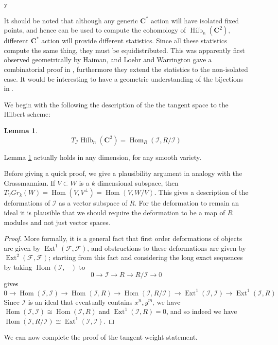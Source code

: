 y\documentclass{amsart}[12pt]
\theoremstyle{definition}
\newtheorem{lemma}[dummy]{Lemma}
\newcommand{\C}{\mathbf{C}}
\DeclareMathOperator{\Hilb}{Hilb}
\DeclareMathOperator{\Ext}{Ext}
\DeclareMathOperator{\Hom}{Hom}
\begin{document}
It should be noted that although any generic $\C^*$ action will have isolated fixed points, and hence can be used to compute the cohomology of $\Hilb_n(\C^2)$, different $\C^*$ action will provide different statistics.  Since all these statistics compute the same thing, they must be equidistributed.  This was apparently first observed geometrically by Haiman, and Loehr and Warrington gave a combinatorial proof in \cite{LW}, furthermore they extend the statistics to the non-isolated case.  It would be interesting to have a geometric understanding of the bijections in \cite{LW}.




We begin with the following the description of the the tangent space to the Hilbert scheme:


\begin{lemma} \label{lem:tangent-hom}
$$T_{\mathcal{I}}\Hilb_n(\C^2)=\Hom_R(\mathcal{I},R/\mathcal{I})$$
\end{lemma}

Lemma \ref{lem:tangent-hom} actually holds in any dimension, for any smooth variety.

Before giving a quick proof, we give a plausibility argument in analogy with the Grassmannian.  If $V\subset W$ is a $k$ dimensional subspace, then $T_V Gr_k(W)=\Hom(V, V^\perp)=\Hom(V, W/V)$.  This gives a description of the deformations of $\mathcal{I}$ as a vector subspace of $R$.  For the deformation to remain an ideal it is plausible that we should require the deformation to be a map of $R$ modules and not just vector spaces.

\begin{proof}
More formally, it is a general fact that first order deformations of objects are given by $\Ext^1(\mathcal{F},\mathcal{F})$, and obstructions to these deformations are given by $\Ext^2(\mathcal{F},\mathcal{F})$; starting from this fact and considering the long exact sequences by taking $\Hom(\mathcal{I}, -)$ to
$$0\to \mathcal{I}\to R\to R/\mathcal{I}\to 0$$
gives 
$$0\to\Hom(\mathcal{I},\mathcal{I})\to \Hom(\mathcal{I}, R)\to\Hom(\mathcal{I},R/\mathcal{I})\to\Ext^1(\mathcal{I}, \mathcal{I})\to\Ext^1(\mathcal{I},R)$$
Since $\mathcal{I}$ is an ideal that eventually contains $x^n, y^m$, we have $\Hom(\mathcal{I},\mathcal{I})\cong\Hom(\mathcal{I}, R)$ and $\Ext^1(\mathcal{I},R)=0$, and so indeed we have $\Hom(\mathcal{I},R/\mathcal{I})\cong\Ext^1(\mathcal{I}, \mathcal{I})$.
\end{proof}

We can now complete the proof of the tangent weight statement.
\end{document}
